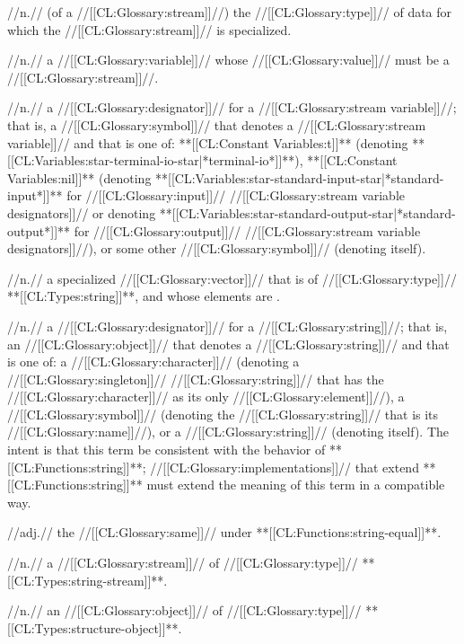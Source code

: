  //n.// (of a //[[CL:Glossary:stream]]//) the //[[CL:Glossary:type]]// of data for which the //[[CL:Glossary:stream]]// is specialized.

 //n.// a //[[CL:Glossary:variable]]// whose //[[CL:Glossary:value]]// must be a //[[CL:Glossary:stream]]//.

 //n.// a //[[CL:Glossary:designator]]// for a //[[CL:Glossary:stream variable]]//; that is, a //[[CL:Glossary:symbol]]// that denotes a //[[CL:Glossary:stream variable]]// and that is one of: **[[CL:Constant Variables:t]]** (denoting **[[CL:Variables:star-terminal-io-star|*terminal-io*]]**), **[[CL:Constant Variables:nil]]** (denoting **[[CL:Variables:star-standard-input-star|*standard-input*]]** for //[[CL:Glossary:input]]// //[[CL:Glossary:stream variable designators]]// or denoting **[[CL:Variables:star-standard-output-star|*standard-output*]]** for //[[CL:Glossary:output]]// //[[CL:Glossary:stream variable designators]]//), or some other //[[CL:Glossary:symbol]]// (denoting itself).

 //n.// a specialized //[[CL:Glossary:vector]]// that is of //[[CL:Glossary:type]]// **[[CL:Types:string]]**, and whose elements are .

 //n.// a //[[CL:Glossary:designator]]// for a //[[CL:Glossary:string]]//; that is, an //[[CL:Glossary:object]]// that denotes a //[[CL:Glossary:string]]// and that is one of: a //[[CL:Glossary:character]]// (denoting a //[[CL:Glossary:singleton]]// //[[CL:Glossary:string]]// that has the //[[CL:Glossary:character]]// as its only //[[CL:Glossary:element]]//), a //[[CL:Glossary:symbol]]// (denoting the //[[CL:Glossary:string]]// that is its //[[CL:Glossary:name]]//), or a //[[CL:Glossary:string]]// (denoting itself).
 The intent is that this term be consistent with the behavior of **[[CL:Functions:string]]**; //[[CL:Glossary:implementations]]// that extend **[[CL:Functions:string]]** must extend the meaning of this term in a compatible way.

 //adj.// the //[[CL:Glossary:same]]// under **[[CL:Functions:string-equal]]**.

 //n.// a //[[CL:Glossary:stream]]// of //[[CL:Glossary:type]]// **[[CL:Types:string-stream]]**.

 //n.// an //[[CL:Glossary:object]]// of //[[CL:Glossary:type]]// **[[CL:Types:structure-object]]**.


